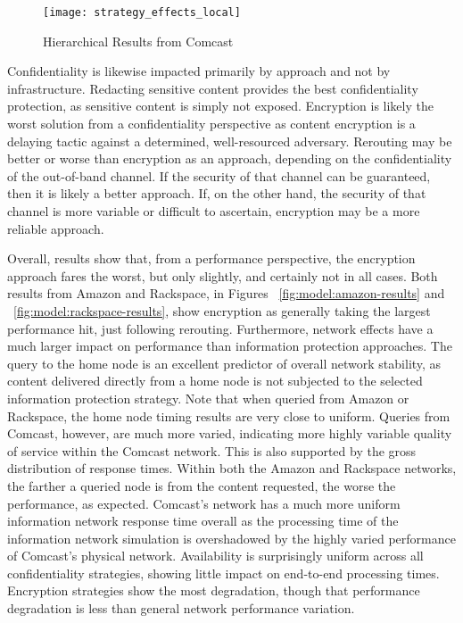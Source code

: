 \begin{figure}[!t]
\centering
\texttt{[image: strategy\_effects\_local]}
\caption{Hierarchical Results from Comcast}
\label{fig:model:comcast-results}
\end{figure}

Confidentiality is likewise impacted primarily by approach and not by infrastructure.  Redacting sensitive content provides the best confidentiality protection, as sensitive content is simply not exposed.  Encryption is likely the worst solution from a confidentiality perspective as content encryption is a delaying tactic against a determined, well-resourced adversary.  Rerouting may be better or worse than encryption as an approach, depending on the confidentiality of the out-of-band channel.  If the security of that channel can be guaranteed, then it is likely a better approach.  If, on the other hand, the security of that channel is more variable or difficult to ascertain, encryption may be a more reliable approach.

Overall, results show that, from a performance perspective, the encryption approach fares the worst, but only slightly, and certainly not in all cases.  Both results from Amazon and Rackspace, in Figures ~\ref{fig:model:amazon-results} and ~\ref{fig:model:rackspace-results}, show encryption as generally taking the largest performance hit, just following rerouting.
Furthermore, network effects have a much larger impact on performance than information protection approaches.  The query to the home node is an excellent predictor of overall network stability, as content delivered directly from a home node is not subjected to the selected information protection strategy.  Note that when queried from Amazon or Rackspace, the home node timing results are very close to uniform.  Queries from Comcast, however, are much more varied, indicating more highly variable quality of service within the Comcast network.  This is also supported by the gross distribution of response times.  Within both the Amazon and Rackspace networks, the farther a queried node is from the content requested, the worse the performance, as expected.  Comcast's network has a much more uniform information network response time overall as the processing time of the information network simulation is overshadowed by the highly varied performance of Comcast's physical network.  Availability is surprisingly uniform across all confidentiality strategies, showing little impact on end-to-end processing times.  Encryption strategies show the most degradation, though that performance degradation is less than general network performance variation.


